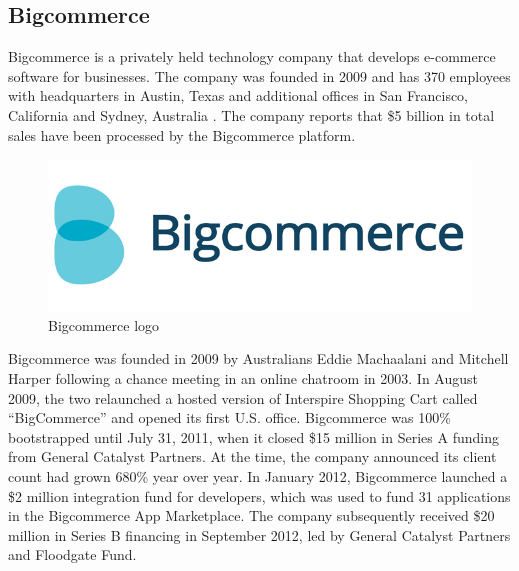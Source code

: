 \subsection{Bigcommerce}
Bigcommerce is a privately held technology company that develops e-commerce software for businesses. The company was founded in 2009 and has 370 employees with headquarters in Austin, Texas and additional offices in San Francisco, California and Sydney, Australia \cite{bigcommerce_overview}.
The company reports that \$5 billion in total sales have been processed by the Bigcommerce platform.
\begin{figure}[htb]
  \centering
  \includegraphics[width=0.5\linewidth]{images/chapter1/bigcommerce_logo.jpg}\hfill
  \caption[Bigcommerce logo]{Bigcommerce logo}
  \label{fig:ebay_logo}
\end{figure}
Bigcommerce was founded in 2009 by Australians Eddie Machaalani and Mitchell Harper following a chance meeting in an online chatroom in 2003. In August 2009, the two relaunched a hosted version of Interspire Shopping Cart called “BigCommerce” and opened its first U.S. office.
\newline
Bigcommerce was 100\% bootstrapped until July 31, 2011, when it closed \$15 million in Series A funding from General Catalyst Partners. At the time, the company announced its client count had grown 680\% year over year. In January 2012, Bigcommerce launched a \$2 million integration fund for developers, which was used to fund 31 applications in the Bigcommerce App Marketplace. The company subsequently received \$20 million in Series B financing in September 2012, led by General Catalyst Partners and Floodgate Fund.
